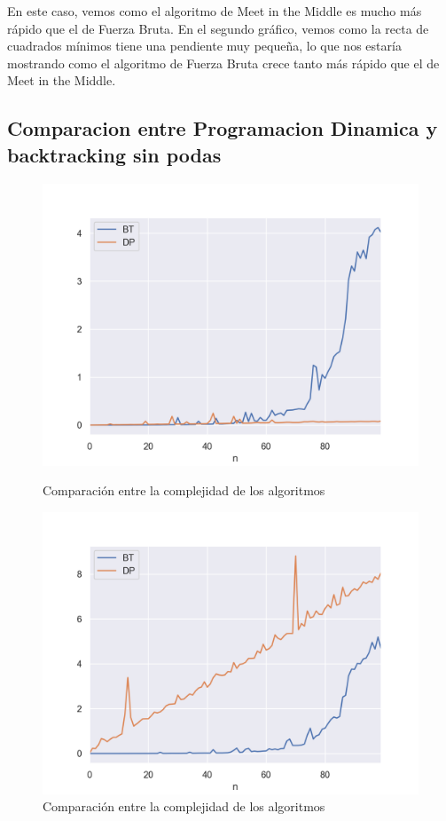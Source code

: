 En este caso, vemos como el algoritmo de Meet in the Middle es mucho más rápido que el de Fuerza Bruta. En el segundo gráfico, vemos como la recta de cuadrados mínimos tiene una pendiente muy pequeña, lo que nos estaría mostrando como el algoritmo de Fuerza Bruta crece tanto más rápido que el de Meet in the Middle.

\subsection{Comparacion entre Programacion Dinamica y backtracking sin podas}

\begin{figure}[H]
   \begin{minipage}{0.5\textwidth}
     \centering
     \includegraphics[width=0.9\linewidth]{img/bt_dp_100_Figure_1}
     \caption{Comparación entre la complejidad de los algoritmos}
   \end{minipage}\hfill
   \begin{minipage}{0.5\textwidth}
     \centering
     \includegraphics[width=0.9\linewidth]{img/bt_dp_10000_Figure_1}
     \caption{Comparación entre la complejidad de los algoritmos}
   \end{minipage}
\end{figure}



